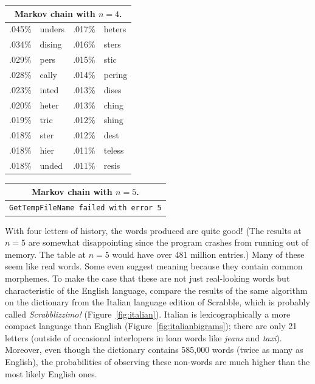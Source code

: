 \documentclass[twocolumn]{article}
\begin{document}
\begin{center}
\begin{tabular}{rl@{\quad\quad}rl}
\multicolumn{4}{c}{Markov chain with $n=4$.} \\
\hline
.045\% & unders  &   .017\% & heters  \\
.034\% & dising  &   .016\% & sters   \\
.029\% & pers    &   .015\% & stic    \\
.028\% & cally   &   .014\% & pering  \\
.023\% & inted   &   .013\% & dises   \\
.020\% & heter   &   .013\% & ching   \\
.019\% & tric    &   .012\% & shing   \\
.018\% & ster    &   .012\% & dest    \\
.018\% & hier    &   .011\% & teless  \\
.018\% & unded   &   .011\% & resis   \\
\end{tabular}
\end{center}

\begin{center}
\begin{tabular}{rl@{\quad\quad}rl}
\multicolumn{4}{c}{Markov chain with $n=5$.} \\
\hline
\multicolumn{4}{l}{{\tt GetTempFileName failed with error 5}} \\
\end{tabular}
\end{center}

With four letters of history, the words produced are quite good! (The
results at $n=5$ are somewhat disappointing since the program crashes
from running out of memory. The table at $n=5$ would have over 481
million entries.) Many of these seem like real words. Some even
suggest meaning because they contain common morphemes. To make the
case that these are not just real-looking words but characteristic of
the English language, compare the results of the same algorithm on the
dictionary from the Italian language edition of Scrabble, which is
probably called {\it Scrabblizzimo!} (Figure~\ref{fig:italian}).
Italian is lexicographically a more compact language than English
(Figure~\ref{fig:italianbigrams}); there are only 21 letters (outside
of occasional interlopers in loan words like {\it jeans} and {\it
  taxi}). Moreover, even though the dictionary contains 585,000 words
(twice as many as English), the probabilities of observing these
non-words are much higher than the most likely English ones.
\end{document}
